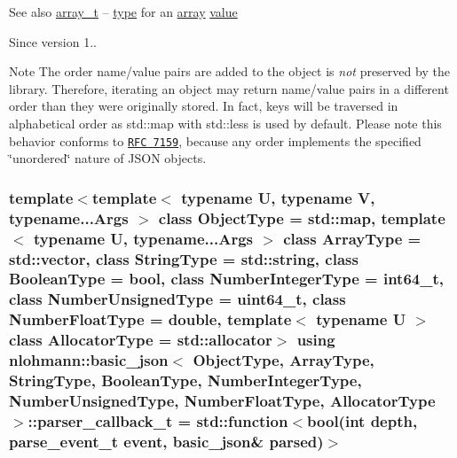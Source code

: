 \begin{DoxySeeAlso}{See also}
\hyperlink{a00025_ab00b882d39306d663c23dab110f5cae0}{array\+\_\+t} -- \hyperlink{a00025_a848cbae3bd3502ffbf738320bf5eb3aa}{type} for an \hyperlink{a00025_a5685815624b086caa532f41e853d4b0f}{array} \hyperlink{a00025_a0a2cbbd95862a623e7dc5c37e67dead0}{value}
\end{DoxySeeAlso}
\begin{DoxySince}{Since}
version 1..
\end{DoxySince}
\begin{DoxyNote}{Note}
The order name/value pairs are added to the object is {\itshape not} preserved by the library. Therefore, iterating an object may return name/value pairs in a different order than they were originally stored. In fact, keys will be traversed in alphabetical order as {\ttfamily std\+::map} with {\ttfamily std\+::less} is used by default. Please note this behavior conforms to \href{http://rfc7159.net/rfc7159}{\tt R\+FC 7159}, because any order implements the specified \char`\"{}unordered\char`\"{} nature of J\+S\+ON objects. 
\end{DoxyNote}
\subsubsection[{\texorpdfstring{parser\+\_\+callback\+\_\+t}{parser\_callback\_t}}]{\setlength{\rightskip}{0pt plus 5cm}template$<$template$<$ typename U, typename V, typename...\+Args $>$ class Object\+Type = std\+::map, template$<$ typename U, typename...\+Args $>$ class Array\+Type = std\+::vector, class String\+Type  = std\+::string, class Boolean\+Type  = bool, class Number\+Integer\+Type  = int64\+\_\+t, class Number\+Unsigned\+Type  = uint64\+\_\+t, class Number\+Float\+Type  = double, template$<$ typename U $>$ class Allocator\+Type = std\+::allocator$>$ using {\bf nlohmann\+::basic\+\_\+json}$<$ Object\+Type, Array\+Type, String\+Type, Boolean\+Type, Number\+Integer\+Type, Number\+Unsigned\+Type, Number\+Float\+Type, Allocator\+Type $>$\+::{\bf parser\+\_\+callback\+\_\+t} =  std\+::function$<$bool(int depth, {\bf parse\+\_\+event\+\_\+t} event, {\bf basic\+\_\+json}\& parsed)$>$}\hypertarget{a00025_a9e35475e2027520a78e09f460dbe048a}{}\label{a00025_a9e35475e2027520a78e09f460dbe048a}


